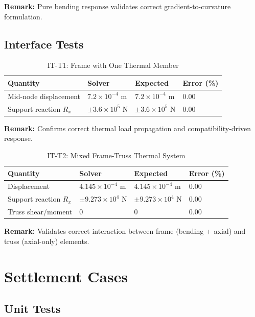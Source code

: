 \textbf{Remark:} Pure bending response validates correct gradient-to-curvature formulation.

\subsection{Interface Tests}

\begin{table}[H]
\centering
\caption{IT-T1: Frame with One Thermal Member}
\begin{tabular}{llll}
\toprule
Quantity & Solver & Expected & Error (\%) \\
\midrule
Mid-node displacement & $7.2 \times 10^{-4}$ m & $7.2 \times 10^{-4}$ m & 0.00 \\
Support reaction $R_x$ & $\pm 3.6 \times 10^{5}$ N & $\pm 3.6 \times 10^{5}$ N & 0.00 \\
\bottomrule
\end{tabular}
\end{table}

\textbf{Remark:} Confirms correct thermal load propagation and compatibility-driven response.

\vspace{0.4cm}

\begin{table}[H]
\centering
\caption{IT-T2: Mixed Frame-Truss Thermal System}
\begin{tabular}{llll}
\toprule
Quantity & Solver & Expected & Error (\%) \\
\midrule
Displacement & $4.145 \times 10^{-4}$ m & $4.145 \times 10^{-4}$ m & 0.00 \\
Support reaction $R_x$ & $\pm 9.273 \times 10^{4}$ N & $\pm 9.273 \times 10^{4}$ N & 0.00 \\
Truss shear/moment & 0 & 0 & 0.00 \\
\bottomrule
\end{tabular}
\end{table}

\textbf{Remark:} Validates correct interaction between frame (bending + axial) and truss (axial-only) elements.

\section{Settlement Cases}

\subsection{Unit Tests}

